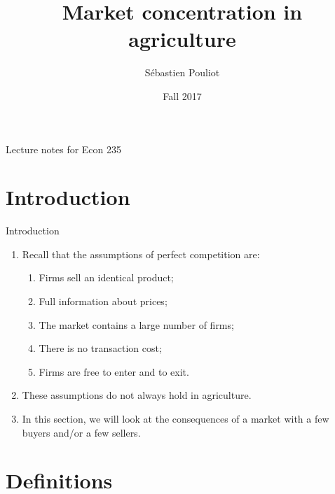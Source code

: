 \documentclass[table,xcolor=pdftex,dvipsnames]{beamer}\usepackage[]{graphicx}\usepackage[]{color}
\title[Market concentration]{Market concentration in agriculture}
\author[Pouliot]{S\'{e}bastien Pouliot}
\institute{Iowa State University}
\date{Fall 2017}
\begin{document}

\begin{frame}
\titlepage
\vspace{-0.4in}
\begin{center}
Lecture notes for Econ 235\\
\end{center}
\end{frame}

\section[Introduction]{Introduction}

\begin{frame}{Introduction}
\begin{enumerate}[label=\textbullet]
  \item Recall that the assumptions of perfect competition are:
     \begin{enumerate}[label=\roman{*})]
          \item Firms sell an identical product;
          \item Full information about prices;
          \item The market contains a large number of firms;
          \item There is no transaction cost;
          \item Firms are free to enter and to exit.
      \end{enumerate}
  \item These assumptions do not always hold in agriculture.
  \item In this section, we will look at the consequences of a market with a few buyers and/or a few sellers.
\end{enumerate}
\end{frame}

\section[Definitions]{Definitions}
\end{document}
